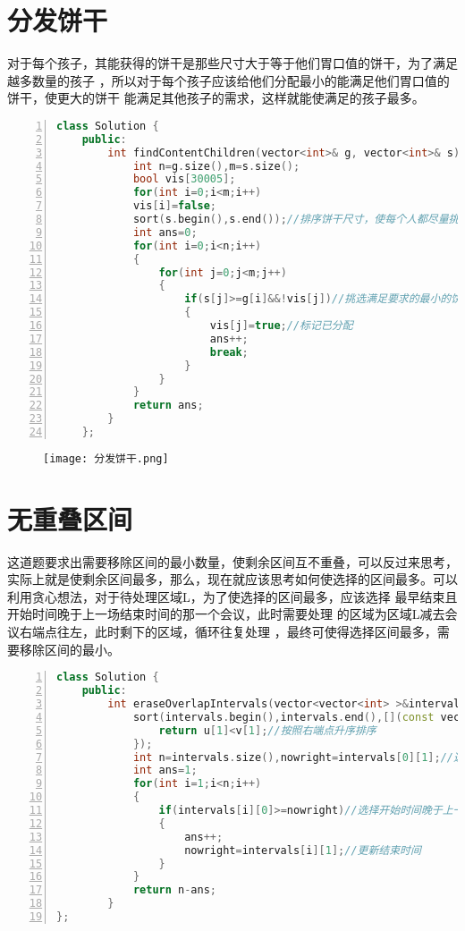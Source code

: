 \documentclass{article}
\begin{document}
\section{分发饼干}
对于每个孩子，其能获得的饼干是那些尺寸大于等于他们胃口值的饼干，为了满足越多数量的孩子
，所以对于每个孩子应该给他们分配最小的能满足他们胃口值的饼干，使更大的饼干
能满足其他孩子的需求，这样就能使满足的孩子最多。
\begin{lstlisting}[language=C++,numbers=left,breaklines=true]
class Solution {
    public:
        int findContentChildren(vector<int>& g, vector<int>& s) {
            int n=g.size(),m=s.size();
            bool vis[30005];
            for(int i=0;i<m;i++)
            vis[i]=false;
            sort(s.begin(),s.end());//排序饼干尺寸，使每个人都尽量挑选更小的饼干
            int ans=0;
            for(int i=0;i<n;i++)
            {
                for(int j=0;j<m;j++)
                {
                    if(s[j]>=g[i]&&!vis[j])//挑选满足要求的最小的饼干
                    {
                        vis[j]=true;//标记已分配
                        ans++;
                        break;
                    }
                }
            }
            return ans;
        }
    };
    \end{lstlisting}
    \begin{figure}[H]
        \begin{flushleft}
        \texttt{[image: 分发饼干.png]}
        \end{flushleft}
    \end{figure}
\newpage
\section{无重叠区间}
这道题要求出需要移除区间的最小数量，使剩余区间互不重叠，可以反过来思考，
实际上就是使剩余区间最多，那么，现在就应该思考如何使选择的区间最多。可以
利用贪心想法，对于待处理区域L，为了使选择的区间最多，应该选择
最早结束且开始时间晚于上一场结束时间的那一个会议，此时需要处理
的区域为区域L减去会议右端点往左，此时剩下的区域，循环往复处理
，最终可使得选择区间最多，需要移除区间的最小。
\begin{lstlisting}[language=C++,numbers=left,breaklines=true]
class Solution {
    public:
        int eraseOverlapIntervals(vector<vector<int> >&intervals) {  
            sort(intervals.begin(),intervals.end(),[](const vector<int> &u, const vector<int> &v) {
                return u[1]<v[1];//按照右端点升序排序
            });
            int n=intervals.size(),nowright=intervals[0][1];//选择最早结束的会议
            int ans=1;
            for(int i=1;i<n;i++) 
            {
                if(intervals[i][0]>=nowright)//选择开始时间晚于上一场结束时间且是最早结束的
                {
                    ans++;
                    nowright=intervals[i][1];//更新结束时间
                }
            }
            return n-ans;
        }
};

\end{lstlisting}
\end{document}
